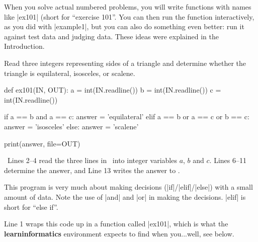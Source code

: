 When you solve actual numbered problems, you will write functions with names like
\pycode|ex101| (short for ``exercise 101''. You can then run the function interactively,
as you did with \pycode|example1|, but you can also do something even better: run it
against test data and judging data. These ideas were explained in the Introduction.


\clearpage


\Question Read three integers representing sides of a triangle and
determine whether the triangle is equilateral, isosceles, or scalene.

\Sample

               {}
               {}

\Solution

\begin{pythoncode} 
  def ex101(IN, OUT):
    a = int(IN.readline())
    b = int(IN.readline())
    c = int(IN.readline())

    if a == b and a == c:
      answer = 'equilateral'
    elif a == b or a == c or b == c:
      answer = 'isosceles'
    else:
      answer = 'scalene'

    print(answer, file=OUT)
\end{pythoncode}

\Explanation\ Lines 2--4 read the three lines in \IN\ into integer variables $a$, $b$ and
$c$. Lines 6--11 determine the answer, and Line 13 writes the answer to \OUT.

This program is very much about making decisions (\pycode|if|/\pycode|elif|/\pycode|else|)
with a small amount of data. Note the use of \pycode|and| and \pycode|or| in making the
decisions. \pycode|elif| is short for ``else if''.

Line 1 wraps this code up in a function called \pycode|ex101|, which is what the
\textbf{learninformatics} environment expects to find when you...well, see below.

